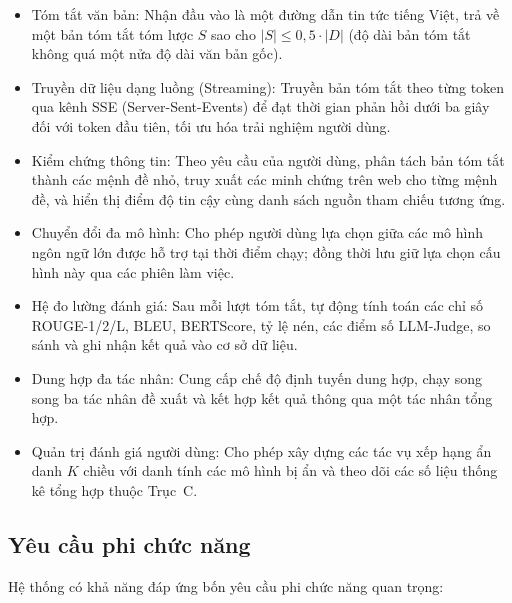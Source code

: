 \begin{itemize}
  \item Tóm tắt văn bản: Nhận đầu vào là một đường dẫn tin tức tiếng Việt, 
        trả về một bản tóm tắt tóm lược $S$ sao cho $|S| \leq 0{,}5 \cdot |D|$ (độ dài bản tóm tắt không quá một nửa độ dài văn bản gốc).
  \item Truyền dữ liệu dạng luồng (Streaming): Truyền bản tóm tắt theo từng token
        qua kênh SSE (Server-Sent-Events) để đạt thời gian phản hồi dưới ba giây đối với token đầu tiên, tối ưu hóa trải nghiệm người dùng.
  \item Kiểm chứng thông tin: Theo yêu cầu của người dùng, phân tách bản tóm tắt thành các 
        mệnh đề nhỏ, truy xuất các minh chứng trên web cho từng mệnh đề, và hiển thị điểm độ tin cậy cùng danh sách nguồn tham chiếu tương ứng.
  \item Chuyển đổi đa mô hình: Cho phép người dùng lựa chọn giữa các mô hình ngôn ngữ lớn 
        được hỗ trợ tại thời điểm chạy; đồng thời lưu giữ lựa chọn cấu hình này qua các phiên làm việc.
  \item Hệ đo lường đánh giá: Sau mỗi lượt tóm tắt, tự động tính toán các chỉ số 
        ROUGE-1/2/L, BLEU, BERTScore, tỷ lệ nén, các điểm số LLM-Judge, so sánh và ghi nhận kết quả vào cơ sở dữ liệu.
  \item Dung hợp đa tác nhân: Cung cấp chế độ định tuyến dung hợp, 
        chạy song song ba tác nhân đề xuất và kết hợp kết quả thông qua một tác nhân tổng hợp.
  \item Quản trị đánh giá người dùng: Cho phép xây dựng các 
        tác vụ xếp hạng ẩn danh $K$ chiều với danh tính các mô hình bị ẩn và theo dõi các số liệu thống kê tổng hợp thuộc Trục~C.
\end{itemize}

\subsection{Yêu cầu phi chức năng}

Hệ thống có khả năng đáp ứng bốn yêu cầu phi chức năng quan trọng: 

